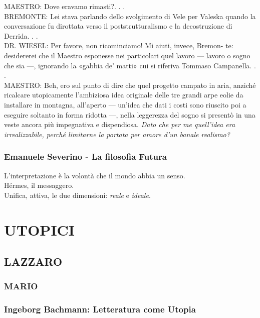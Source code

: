 \documentclass[12pt,a4paper]{article}
\begin{document}
MAESTRO: Dove eravamo rimasti?. . .\\
BREMONTE: Lei stava parlando dello svolgimento di Vele per Valeska
quando la conversazione fu dirottata verso il poststrutturalismo e la
decostruzione di Derrida. . .\\
DR. WIESEL: Per favore, non ricominciamo! Mi aiuti, invece, Bremon-
te: desidererei che il Maestro esponesse nei particolari quel lavoro
— lavoro o sogno che sia —, ignorando la «gabbia de’ matti» cui si
riferiva Tommaso Campanella. . .\\
MAESTRO: Beh, ero sul punto di dire che quel progetto campato in aria,
anziché ricalcare utopicamente l’ambiziosa idea originale delle tre grandi
arpe eolie da installare in montagna, all’aperto — un’idea che dati i costi
sono riuscito poi a eseguire soltanto in forma ridotta —, nella leggerezza
del sogno si presentò in una veste ancora più impegnativa e dispendiosa.
\emph{Dato che per me quell’idea era irrealizzabile, perché limitarne la portata
per amore d’un banale realismo?}\\

\subsubsection{Emanuele Severino - La filosofia Futura}

L'interpretazione è la volontà che il mondo abbia un senso.\\
Hérmes, il messaggero. \\
Unifica, attiva, le due dimensioni: \emph{reale} e \emph{ideale}.\\

\section{UTOPICI}

\subsection{LAZZARO}

\subsubsection{MARIO}

\subsubsection{Ingeborg Bachmann: Letteratura come Utopia}
\end{document}
